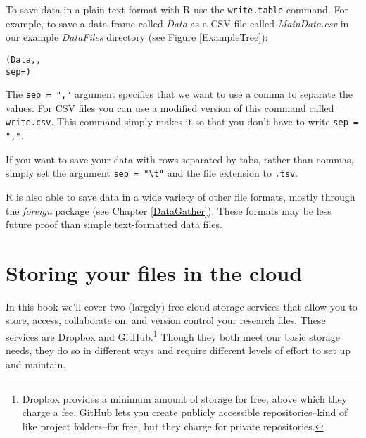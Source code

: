 To save data in a plain-text format with R use the \texttt{write.table} command. For example, to save a data frame called {\emph{Data}} as a CSV file called {\emph{MainData.csv}} in our example {\emph{DataFiles}} directory (see Figure \ref{ExampleTree}):

\begin{knitrout}
\color{fgcolor}\begin{kframe}
\begin{alltt}
(Data, ,
                 sep = )
\end{alltt}
\end{kframe}
\end{knitrout}


\noindent The \texttt{sep = ","} argument specifies that we want to use a comma to separate the values. For CSV files you can use a modified version of this command called \texttt{write.csv}. This command simply makes it so that you don't have to write \texttt{sep = ","}. 

If you want to save your data with rows separated by tabs, rather than commas, simply set the argument \texttt{sep = "\textbackslash{}t"} and the file extension to \texttt{.tsv}.\label{TSVEscape}

R is also able to save data in a wide variety of other file formats, mostly through the {\emph{foreign}} package (see Chapter \ref{DataGather}). These formats may be less future proof than simple text-formatted data files.

\section{Storing your files in the cloud}

In this book we'll cover two (largely) free cloud storage services that allow you to store, access, collaborate on, and version control your research files. These services are Dropbox and GitHub.\footnote{Dropbox provides a minimum amount of storage for free, above which they charge a fee. GitHub lets you create publicly accessible repositories--kind of like project folders--for free, but they charge for private repositories.} Though they both meet our basic storage needs, they do so in different ways and require different levels of effort to set up and maintain.

